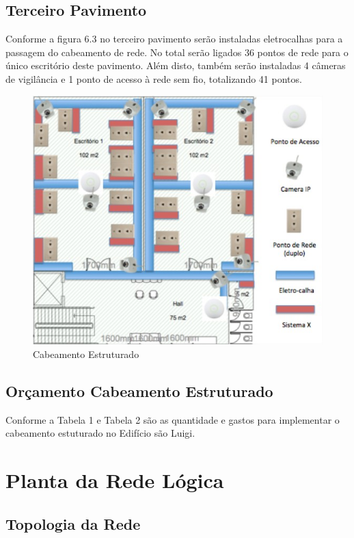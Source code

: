 \documentclass[	DIV=calc,%
							paper=a4,%
							fontsize=12pt,%
							onecolumn]{scrartcl}	 					%
\begin{document}
\subsection{Terceiro Pavimento}
{\raggedright Conforme a figura 6.3 no terceiro pavimento serão instaladas eletrocalhas para a passagem
do cabeamento de rede. No total serão ligados 36 pontos de rede para o único escritório
deste pavimento. Além disto, também serão instaladas 4 câmeras de vigilância e 1 ponto
de acesso à rede sem fio, totalizando 41 pontos.
}
\begin{figure}[H]
  \centering
  \includegraphics[width=\textwidth]{piso33} 
  \caption{Cabeamento Estruturado}
  \label{fig:methodology}
\end{figure}

\subsection{Orçamento Cabeamento Estruturado}
{\raggedright Conforme a Tabela 1 e Tabela 2 são as quantidade e gastos para implementar o cabeamento estuturado no Edifício são Luigi.
}



\section{Planta da Rede Lógica}
\subsection{Topologia da Rede}
\end{document}
